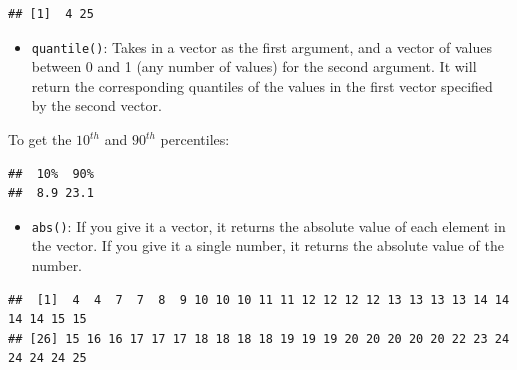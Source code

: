 \documentclass[
]{book}
\newenvironment{Shaded}{\begin{snugshade}}{\end{snugshade}}
\newcommand{\FloatTok}[1]{\textcolor[rgb]{0.00,0.00,0.81}{#1}}
\newcommand{\KeywordTok}[1]{\textcolor[rgb]{0.13,0.29,0.53}{\textbf{#1}}}
\newcommand{\NormalTok}[1]{#1}
\newcommand{\OperatorTok}[1]{\textcolor[rgb]{0.81,0.36,0.00}{\textbf{#1}}}
\providecommand{\tightlist}{%
  \setlength{\itemsep}{0pt}\setlength{\parskip}{0pt}}
\begin{document}
\begin{Shaded}
\end{Shaded}

\begin{verbatim}
## [1]  4 25
\end{verbatim}

\begin{itemize}
\tightlist
\item
  \texttt{quantile()}: Takes in a vector as the first argument, and a vector of values between 0 and 1 (any number of values) for the second argument. It will return the corresponding quantiles of the values in the first vector specified by the second vector.
\end{itemize}

To get the \(10^{th}\) and \(90^{th}\) percentiles:

\begin{Shaded}
\end{Shaded}

\begin{verbatim}
##  10%  90% 
##  8.9 23.1
\end{verbatim}

\begin{itemize}
\tightlist
\item
  \texttt{abs()}: If you give it a vector, it returns the absolute value of each element in the vector. If you give it a single number, it returns the absolute value of the number.
\end{itemize}

\begin{Shaded}
\end{Shaded}

\begin{verbatim}
##  [1]  4  4  7  7  8  9 10 10 10 11 11 12 12 12 12 13 13 13 13 14 14 14 14 15 15
## [26] 15 16 16 17 17 17 18 18 18 18 19 19 19 20 20 20 20 20 22 23 24 24 24 24 25
\end{verbatim}
\end{document}
